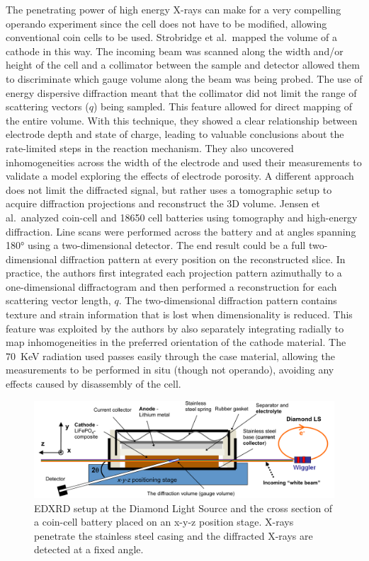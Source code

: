 \documentclass[journal=cmatex,manuscript=perspective]{achemso}
\begin{document}
The penetrating power of high energy X-rays can make for a very
compelling operando experiment since the cell does not have to be
modified, allowing conventional coin cells to be used. Strobridge et
al.\ mapped the volume of a  cathode in this
way\cite{strobridge2015}. The incoming beam was scanned along the
width and/or height of the cell and a collimator between the sample
and detector allowed them to discriminate which gauge volume along the
beam was being probed. The use of energy dispersive diffraction meant
that the collimator did not limit the range of scattering vectors
($q$) being sampled. This feature allowed for direct mapping of the
entire volume. With this technique, they showed a clear relationship
between electrode depth and state of charge, leading to valuable
conclusions about the rate-limited steps in the reaction
mechanism. They also uncovered inhomogeneities across the width of the
electrode and used their measurements to validate a model exploring
the effects of electrode porosity. A different approach does not limit
the diffracted signal, but rather uses a tomographic setup to acquire
diffraction projections and reconstruct the 3D volume. Jensen et
al.\ analyzed coin-cell and 18650 cell batteries using tomography and
high-energy diffraction\cite{jensen2015}. Line scans were performed
across the battery and at angles spanning \ang{180} using a
two-dimensional detector. The end result could be a full
two-dimensional diffraction pattern at every position on the
reconstructed slice. In practice, the authors first integrated each
projection pattern azimuthally to a one-dimensional diffractogram and
then performed a reconstruction for each scattering vector length,
$q$. The two-dimensional diffraction pattern contains texture and
strain information\cite{bobhe} that is lost when dimensionality is
reduced. This feature was exploited by the authors by also separately
integrating radially to map inhomogeneities in the preferred
orientation of the  cathode material. The \SI{70}{KeV}
radiation used passes easily through the case material, allowing the
measurements to be performed in situ (though not operando), avoiding
any effects caused by disassembly of the cell.

\begin{figure}
  \includegraphics[width=\textwidth]{strobridge2015.png}
  \caption{ EDXRD setup at the Diamond Light Source and the
    cross section of a coin-cell battery placed on an x-y-z position
    stage. X-rays penetrate the stainless steel casing and the
    diffracted X-rays are detected at a fixed angle.\cite{strobridge2015}}
  \label{figure:strobridge2015}
\end{figure}
\end{document}
